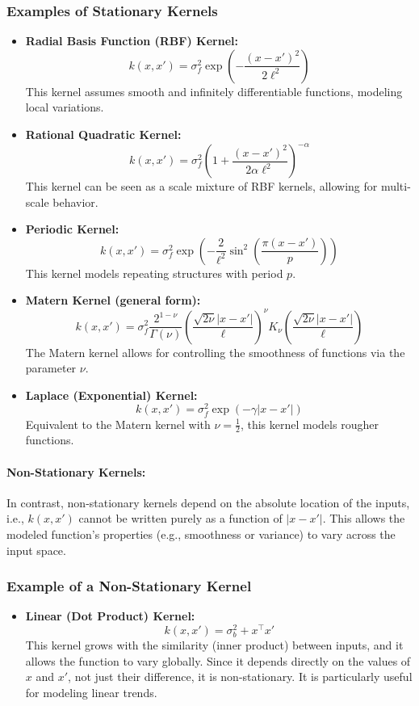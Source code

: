 \documentclass{article}
\begin{document}
\subsubsection*{Examples of Stationary Kernels}
\begin{itemize}
    \item \textbf{Radial Basis Function (RBF) Kernel:}
    \[
    k(x, x') = \sigma_f^2 \exp\left( -\frac{(x - x')^2}{2\ell^2} \right)
    \]
    This kernel assumes smooth and infinitely differentiable functions, modeling local variations.

    \item \textbf{Rational Quadratic Kernel:}
    \[
    k(x, x') = \sigma_f^2 \left( 1 + \frac{(x - x')^2}{2 \alpha \ell^2} \right)^{-\alpha}
    \]
    This kernel can be seen as a scale mixture of RBF kernels, allowing for multi-scale behavior.

    \item \textbf{Periodic Kernel:}
    \[
    k(x, x') = \sigma_f^2 \exp\left( -\frac{2}{\ell^2} \sin^2\left( \frac{\pi (x - x')}{p} \right) \right)
    \]
    This kernel models repeating structures with period \( p \).

    \item \textbf{Matern Kernel (general form):}
    \[
    k(x, x') = \sigma_f^2 \frac{2^{1-\nu}}{\Gamma(\nu)} \left( \frac{\sqrt{2\nu} |x - x'|}{\ell} \right)^\nu K_\nu\left( \frac{\sqrt{2\nu} |x - x'|}{\ell} \right)
    \]
    The Matern kernel allows for controlling the smoothness of functions via the parameter \( \nu \).

    \item \textbf{Laplace (Exponential) Kernel:}
    \[
    k(x, x') = \sigma_f^2 \exp\left( -\gamma |x - x'| \right)
    \]
    Equivalent to the Matern kernel with \( \nu = \frac{1}{2} \), this kernel models rougher functions.
\end{itemize}

\paragraph{Non-Stationary Kernels:}  
In contrast, non-stationary kernels depend on the absolute location of the inputs, i.e., \( k(x, x') \) cannot be written purely as a function of \( |x - x'| \). This allows the modeled function's properties (e.g., smoothness or variance) to vary across the input space.

\subsubsection*{Example of a Non-Stationary Kernel}
\begin{itemize}
    \item \textbf{Linear (Dot Product) Kernel:}
    \[
    k(x, x') = \sigma_b^2 + x^\top x'
    \]
    This kernel grows with the similarity (inner product) between inputs, and it allows the function to vary globally. Since it depends directly on the values of \( x \) and \( x' \), not just their difference, it is non-stationary. It is particularly useful for modeling linear trends.
\end{itemize}
\end{document}
